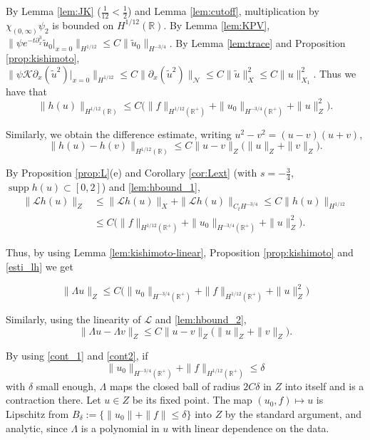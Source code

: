 \documentclass[10pt,reqno]{amsart}
\theoremstyle{remark}
\numberwithin{equation}{section}
\newcommand{\R}{\mathbb R}
\newcommand{\pd}{\partial}
\newcommand{\supp}{\operatorname{supp}}
\newcommand{\Lc}{\mathcal{L}}
\newcommand{\Kc}{\mathcal{K}}
\begin{document}
By Lemma \ref{lem:JK} ($\frac1{12}<\frac12$) and Lemma \ref{lem:cutoff}, multiplication by $\chi_{(0,\infty)}\psi_2$ is bounded on $H^{1/12}(\R)$. By Lemma \ref{lem:KPV}, $\|\psi e^{-t\pd_x^3}\tilde u_0|_{x=0}\|_{H^{1/12}}\le C\|\tilde u_0\|_{H^{-3/4}}$. By Lemma \ref{lem:trace} and Proposition \ref{prop:kishimoto}, $\|\psi\Kc\pd_x(\tilde u^2)|_{x=0}\|_{H^{1/12}}\le C\|\pd_x(\tilde u^2)\|_{\mathcal N}\le C\|\tilde u\|_X^2\le C\|u\|^2_{X_1}$. Thus we have that 
\begin{equation}\label{lem:hbound_1}
\|h(u)\|_{H^{1/12}(\R)}\le C\big(\|f\|_{H^{1/12}(\R^+)}+\|u_0\|_{H^{-3/4}(\R^+)}+\|u\|_Z^2\big).
\end{equation}

Similarly,  we obtain the difference estimate, writing $u^2-v^2=(u-v)(u+v)$,
\begin{equation}\label{lem:hbound_2}
\|h(u)-h(v)\|_{H^{1/12}(\R)}\le C\|u-v\|_Z\big(\|u\|_Z+\|v\|_Z\big).
\end{equation}


By Proposition \ref{prop:L}(e) and Corollary \ref{cor:Lext} (with $s=-\frac34$, $\supp h(u)\subset[0,2]$) and \eqref{lem:hbound_1}, \begin{equation}\label{esti_lh}
\begin{split}
\|\Lc h(u)\|_Z&\le\|\Lc h(u)\|_{X}+\|\Lc h(u)\|_{C_tH^{-3/4}}\le C\|h(u)\|_{H^{1/12}}\\&\le C\big(\|f\|_{H^{1/12}(\R^+)}+\|u_0\|_{H^{-3/4}(\R^+)}+\|u\|_Z^2\big).
\end{split}
\end{equation}




Thus, by using Lemma \ref{lem:kishimoto-linear}, Proposition \ref{prop:kishimoto} and \eqref{esti_lh} we get

\begin{equation}\label{cont_1}
\|\Lambda u\|_Z\le C\big(\|u_0\|_{H^{-3/4}(\R^+)}+\|f\|_{H^{1/12}(\R^+)}+\|u\|_Z^2\big)\end{equation}

Similarly, using the linearity of $\Lc$ and \eqref{lem:hbound_2}, \begin{equation}\label{cont2}\|\Lambda u-\Lambda v\|_Z\le C\|u-v\|_Z\big(\|u\|_Z+\|v\|_Z\big).\end{equation}




By using \eqref{cont_1} and \eqref{cont2}, if $$\|u_0\|_{H^{-3/4}(\R^+)}+\|f\|_{H^{1/12}(\R^+)}\le\delta$$ with $\delta$ small enough, $\Lambda$ maps the closed ball of radius $2C\delta$ in $Z$ into itself and is a contraction there. Let $u\in Z$ be its fixed point. The map $(u_0,f)\mapsto u$ is Lipschitz from $B_\delta:=\{\|u_0\|+\|f\|\le\delta\}$ into $Z$ by the standard argument, and analytic, since $\Lambda$ is a polynomial in $u$ with linear dependence on the data.
\end{document}

